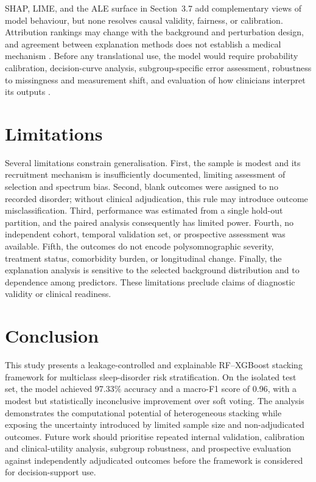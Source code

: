 \documentclass{elektr}
\begin{document}
SHAP, LIME, and the ALE surface in Section~3.7 add complementary views of model behaviour, but none resolves causal validity, fairness, or calibration. Attribution rankings may change with the background and perturbation design, and agreement between explanation methods does not establish a medical mechanism \cite{instanceshap2023,jung2023,pesapane2026}. Before any translational use, the model would require probability calibration, decision-curve analysis, subgroup-specific error assessment, robustness to missingness and measurement shift, and evaluation of how clinicians interpret its outputs \cite{hu2024,tripodai2024,futureai2025}.


\section{Limitations}
Several limitations constrain generalisation. First, the sample is modest and its recruitment mechanism is insufficiently documented, limiting assessment of selection and spectrum bias. Second, blank outcomes were assigned to no recorded disorder; without clinical adjudication, this rule may introduce outcome misclassification. Third, performance was estimated from a single hold-out partition, and the paired analysis consequently has limited power. Fourth, no independent cohort, temporal validation set, or prospective assessment was available. Fifth, the outcomes do not encode polysomnographic severity, treatment status, comorbidity burden, or longitudinal change. Finally, the explanation analysis is sensitive to the selected background distribution and to dependence among predictors. These limitations preclude claims of diagnostic validity or clinical readiness.

\section{Conclusion}
This study presents a leakage-controlled and explainable RF--XGBoost stacking framework for multiclass sleep-disorder risk stratification. On the isolated test set, the model achieved 97.33\% accuracy and a macro-F1 score of 0.96, with a modest but statistically inconclusive improvement over soft voting. The analysis demonstrates the computational potential of heterogeneous stacking while exposing the uncertainty introduced by limited sample size and non-adjudicated outcomes. Future work should prioritise repeated internal validation, calibration and clinical-utility analysis, subgroup robustness, and prospective evaluation against independently adjudicated outcomes before the framework is considered for decision-support use.
\end{document}
